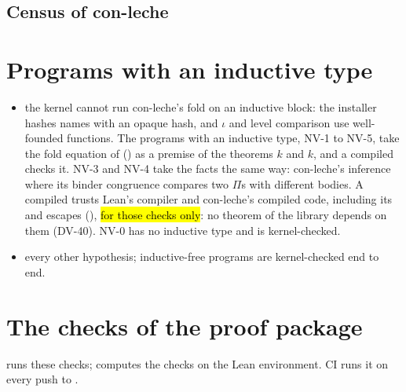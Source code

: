 \subsection{Census of con-leche}\label{sec:trust-census-conleche}



\section{Programs with an inductive type}\label{sec:trust-gap}

\begin{itemize}
\item {} the kernel cannot run con-leche's fold on an inductive block: the installer
  hashes names with an opaque hash, and $\iota$ and level comparison use well-founded functions.
  The programs with an inductive type, NV-1 to NV-5, take the fold equation of  () as a
  premise of the theorems $k$ and $k$, and a compiled 
  checks it. NV-3 and NV-4 take the facts  the same way: con-leche's inference where its binder congruence compares two $\Pi$s with different bodies. A compiled  trusts Lean's compiler and con-leche's compiled code, including its  and  escapes (), \hl{for those checks only}: no theorem of the library depends on them (DV-40). NV-0 has no inductive type and is kernel-checked.
\item {} every other hypothesis; inductive-free programs are
  kernel-checked end to end.
\end{itemize}

\section{The checks of the proof package}\label{sec:trust-checks}

 runs these checks;  computes the
checks on the Lean environment. CI runs it on every push to .

